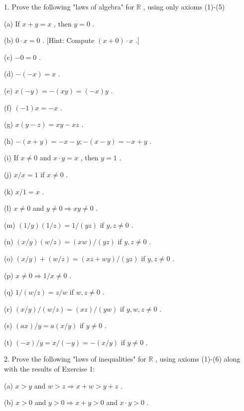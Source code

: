 \documentclass[10pt]{article}
\begin{document}
1. Prove the following "laws of algebra" for \(\mathbb{R}\) , using only axioms (1)-(5)

(a) If \(x + y = x\) , then \(y = 0\) .

(b) \(0 \cdot  x = 0\) . [Hint: Compute \(\left( {x + 0}\right)  \cdot  x\) .]

(c) \(- 0 = 0\) .

(d) \(- \left( {-x}\right)  = x\) .

(e) \(x\left( {-y}\right)  =  - \left( {xy}\right)  = \left( {-x}\right) y\) .

(f) \(\left( {-1}\right) x =  - x\) .

(g) \(x\left( {y - z}\right)  = {xy} - {xz}\) .

(h) \(- \left( {x + y}\right)  =  - x - y; - \left( {x - y}\right)  =  - x + y\) .

(i) If \(x \neq  0\) and \(x \cdot  y = x\) , then \(y = 1\) .

(j) \(x/x = 1\) if \(x \neq  0\) .

(k) \(x/1 = x\) .

(l) \(x \neq  0\) and \(y \neq  0 \Rightarrow  {xy} \neq  0\) .

(m) \(\left( {1/y}\right) \left( {1/z}\right)  = 1/\left( {yz}\right)\) if \(y,z \neq  0\) .

(n) \(\left( {x/y}\right) \left( {w/z}\right)  = \left( {xw}\right) /\left( {yz}\right)\) if \(y,z \neq  0\) .

(o) \(\left( {x/y}\right)  + \left( {w/z}\right)  = \left( {{xz} + {wy}}\right) /\left( {yz}\right)\) if \(y,z \neq  0\) .

(p) \(x \neq  0 \Rightarrow  1/x \neq  0\) .

(q) \(1/\left( {w/z}\right)  = z/w\) if \(w,z \neq  0\) .

(r) \(\left( {x/y}\right) /\left( {w/z}\right)  = \left( {xz}\right) /\left( {yw}\right)\) if \(y,w,z \neq  0\) .

(s) \(\left( {ax}\right) /y = a\left( {x/y}\right)\) if \(y \neq  0\) .

(t) \(\left( {-x}\right) /y = x/\left( {-y}\right)  =  - \left( {x/y}\right)\) if \(y \neq  0\) .

2. Prove the following "laws of inequalities" for \(\mathbb{R}\) , using axioms (1)-(6) along with the results of Exercise 1:

(a) \(x > y\) and \(w > z \Rightarrow  x + w > y + z\) .

(b) \(x > 0\) and \(y > 0 \Rightarrow  x + y > 0\) and \(x \cdot  y > 0\) .
\end{document}
